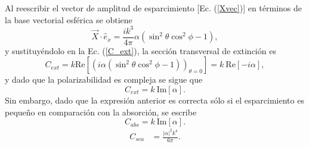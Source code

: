  Al reescribir el vector de amplitud de esparcimiento [Ec. (\ref{Xvec})] en términos de la base vectorial esférica se obtiene
\begin{equation*}
	\Vec{X}\cdot\hat{e}_x=\frac{ik^3}{4\pi}\alpha(\sin^2\theta\cos^2\phi-1),  
\end{equation*}
y sustituyéndolo en la Ec. (\ref{C_ext}), la sección transversal de extinción es
\begin{equation*}
	C_{ext}=k \mbox{Re}\left[\left(i\alpha(\sin^2\theta\cos^2\phi-1)\right)_{\theta=0}\right]=k\:\mbox{Re}\left[-i\alpha\right],
\end{equation*}
y dado que la polarizabilidad es compleja se sigue que
\begin{equation*}
	C_{ext}=k\: \mbox{Im}[\alpha].    
\end{equation*}
	Sin embargo, dado que la expresión anterior es correcta  sólo si el esparcimiento es pequeño en comparación con la absorción, se escribe \cite{Bohren}
\begin{equation}
	C_{abs}=k\: \mbox{Im}[\alpha].    
\end{equation}
\begin{align}
	C_{sca}&=\frac{|\alpha|^2k^4}{6\pi}.
\end{align}